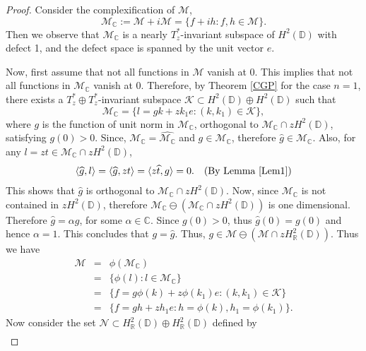 \documentclass[11pt]{amsart}
\numberwithin{equation}{section}
\begin{document}
\begin{proof}
Consider the complexification of $\mathcal{M}$, 
$$\mathcal{M}_\mathbb{C}:=\mathcal{M}+i\mathcal{M}=\{f+ih : f,h \in \mathcal{M}\}.$$
Then we observe that $\mathcal{M}_{\mathbb{C}}$ is a nearly $T^*_z$-invariant subspace of $H^2(\mathbb{D})$ with defect 1, and the defect space is spanned by the unit vector $e$. 

  Now, first assume that not all functions in $\mathcal{M}$ vanish at $0$. This implies that not all functions in $\mathcal{M}_{\mathbb{C}}$ vanish at $0$. Therefore, by Theorem \ref{CGP} for the case $n=1$, there exists a $T^*_z\oplus T^*_z$-invariant subspace $\mathcal{K}\subset H^2(\mathbb{D})\oplus H^2(\mathbb{D})$ such that
  $$\mathcal{M}_{\mathbb{C}}=\Big\{l=gk + zk_1e : (k,k_1)\in \mathcal{K}\Big\},$$
  where $g$ is the function of unit norm in $\mathcal{M}_\mathbb{C}$, orthogonal to $\mathcal{M}_\mathbb{C}\cap zH^2(\mathbb{D})$, satisfying $g(0)>0$. Since, $\mathcal{M}_\mathbb{C}=\widehat{\mathcal{M}_\mathbb{C}}$ and $g \in \mathcal{M}_\mathbb{C}$, therefore $\widehat{g} \in \mathcal{M}_\mathbb{C}$. Also, for any $l=zt \in \mathcal{M}_\mathbb{C}\cap zH^2(\mathbb{D})$,
 \begin{eqnarray*}
 \langle \widehat{g},l \rangle =\langle \widehat{g},zt \rangle = \langle z\widehat{t}, g \rangle = 0. &&\text{(By Lemma \ref{Lem1})}   
 \end{eqnarray*}
 This shows that $\widehat{g}$ is orthogonal to  $\mathcal{M}_\mathbb{C}\cap zH^2(\mathbb{D})$. Now, since $\mathcal{M}_{\mathbb{C}}$ is not contained in $zH^2(\mathbb{D})$, therefore $\mathcal{M}_\mathbb{C}\ominus (\mathcal{M}_\mathbb{C}\cap zH^2(\mathbb{D})) $ is one dimensional. Therefore $\widehat{g}=\alpha g$, for some $\alpha \in \mathbb{C}$. Since $g(0)>0$, thus $\widehat{g}(0)=g(0)$ and hence $\alpha=1$. This concludes that $g=\widehat{g}$. Thus, $g\in \mathcal{M} \ominus (\mathcal{M}\cap zH^2_{\mathbb{R}}(\mathbb{D}))$. 
Thus we have 
\begin{eqnarray*}
    \mathcal{M} &=& \phi(\mathcal{M}_\mathbb{C})\\
    &=&\{\phi(l): l \in \mathcal{M}_\mathbb{C} \}\\
    &=& \Big\{f=g\phi(k) + z\phi(k_1)e : (k,k_1) \in \mathcal{K}\Big\}\\
    &=& \Big\{f=gh + zh_1e : h=\phi(k), h_1=\phi(k_1)\Big\}.
\end{eqnarray*}
Now consider the set $\mathcal{N}\subset H^2_{\mathbb{R}}(\mathbb{D}) \oplus H^2_{\mathbb{R}}(\mathbb{D})$ defined by
\begin{eqnarray*}

\end{eqnarray*}
\end{proof}
\end{document}
